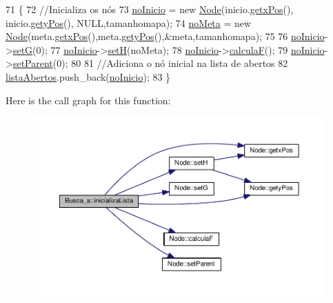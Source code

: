 \begin{DoxyCode}
71 \{
72     \textcolor{comment}{//Inicializa os nós}
73     \hyperlink{classBusca__a_ad60d0bcbabc1677bfe701b9bb6f8ccf6}{noInicio} = \textcolor{keyword}{new} \hyperlink{classNode}{Node}(inicio.\hyperlink{classNode_a81aba8cc7d7ebd60051bb7cba210f587}{getxPos}(), inicio.\hyperlink{classNode_a7d26325d2355b29184cd6b428a78508b}{getyPos}(), NULL,tamanhomapa);
74     \hyperlink{classBusca__a_ae9276b091e39db37bfef34dc0fa5c19b}{noMeta} = \textcolor{keyword}{new} \hyperlink{classNode}{Node}(meta.\hyperlink{classNode_a81aba8cc7d7ebd60051bb7cba210f587}{getxPos}(),meta.\hyperlink{classNode_a7d26325d2355b29184cd6b428a78508b}{getyPos}(),&meta,tamanhomapa);
75     
76     \hyperlink{classBusca__a_ad60d0bcbabc1677bfe701b9bb6f8ccf6}{noInicio}->\hyperlink{classNode_ac269852dd9117461a6069589470c39f1}{setG}(0);
77     \hyperlink{classBusca__a_ad60d0bcbabc1677bfe701b9bb6f8ccf6}{noInicio}->\hyperlink{classNode_aa10f28d0b00917bc5106373c73eb636f}{setH}(noMeta);
78     \hyperlink{classBusca__a_ad60d0bcbabc1677bfe701b9bb6f8ccf6}{noInicio}->\hyperlink{classNode_aedfbcdc45d98f312e507e34e18b26093}{calculaF}();
79     \hyperlink{classBusca__a_ad60d0bcbabc1677bfe701b9bb6f8ccf6}{noInicio}->\hyperlink{classNode_aaed3b50ac429bae4e3460f19c23a9f71}{setParent}(0);
80     
81     \textcolor{comment}{//Adiciona o nó inicial na lista de abertos}
82     \hyperlink{classBusca__a_a75cdf1a045b9836fd8e61604846fa436}{listaAbertos}.push\_back(\hyperlink{classBusca__a_ad60d0bcbabc1677bfe701b9bb6f8ccf6}{noInicio});
83 \}
\end{DoxyCode}


Here is the call graph for this function\+:
\nopagebreak
\begin{figure}[H]
\begin{center}
\leavevmode
\includegraphics[width=350pt]{classBusca__a_ab02900e76a563ccb100ce83ecbf96660_cgraph}
\end{center}
\end{figure}


